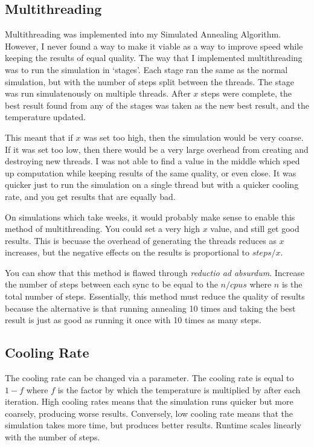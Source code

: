 \documentclass[a4paper, 11pt,table]{article}
\begin{document}
\subsection{Multithreading}
Multithreading was implemented into my Simulated Annealing Algorithm. However, I never found a way to make it viable as a way to improve speed while keeping the results of equal quality. The way that I implemented multithreading was to run the simulation in `stages'. Each stage ran the same as the normal simulation, but with the number of steps split between the threads. The stage was run simulatenously on multiple threads. After $x$ steps were complete, the best result found from any of the stages was taken as the new best result, and the temperature updated.

This meant that if $x$ was set too high, then the simulation would be very coarse. If it was set too low, then there would be a very large overhead from creating and destroying new threads. I was not able to find a value in the middle which sped up computation while keeping results of the same quality, or even close. It was quicker just to run the simulation on a single thread but with a quicker cooling rate, and you get results that are equally bad.

On simulations which take weeks, it would probably make sense to enable this method of multithreading. You could set a very high $x$ value, and still get good results. This is becuase the overhead of generating the threads reduces as $x$ increases, but the negative effects on the results is proportional to $steps/x$.

You can show that this method is flawed through \emph{reductio ad absurdum}. Increase the number of steps between each sync to be equal to the $n/cpus$ where $n$ is the total number of steps. Essentially, this method must reduce the quality of results because the alternative is that running annealing 10 times and taking the best result is just as good as running it once with 10 times as many steps.

\subsection{Cooling Rate}
The cooling rate can be changed via a parameter. The cooling rate is equal to $1-f$ where $f$ is the factor by which the temperature is multiplied by after each iteration. High cooling rates means that the simulation runs quicker but more coarsely, producing worse results. Conversely, low cooling rate means that the simulation takes more time, but produces better results. Runtime scales linearly with the number of steps.
\end{document}

